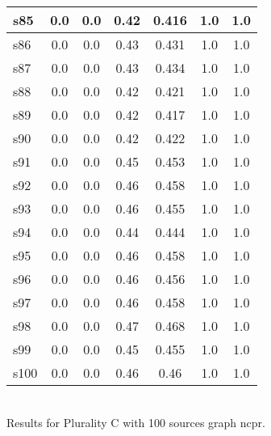 \documentclass{article}
\begin{document}
\begin{tabular}{|l|c|c|c|c|c|c|}
\hline
s85 &0.0 & 0.0 & 0.42 & 0.416 & 1.0 & 1.0\\
\hline
s86 &0.0 & 0.0 & 0.43 & 0.431 & 1.0 & 1.0\\
\hline
s87 &0.0 & 0.0 & 0.43 & 0.434 & 1.0 & 1.0\\
\hline
s88 &0.0 & 0.0 & 0.42 & 0.421 & 1.0 & 1.0\\
\hline
s89 &0.0 & 0.0 & 0.42 & 0.417 & 1.0 & 1.0\\
\hline
s90 &0.0 & 0.0 & 0.42 & 0.422 & 1.0 & 1.0\\
\hline
s91 &0.0 & 0.0 & 0.45 & 0.453 & 1.0 & 1.0\\
\hline
s92 &0.0 & 0.0 & 0.46 & 0.458 & 1.0 & 1.0\\
\hline
s93 &0.0 & 0.0 & 0.46 & 0.455 & 1.0 & 1.0\\
\hline
s94 &0.0 & 0.0 & 0.44 & 0.444 & 1.0 & 1.0\\
\hline
s95 &0.0 & 0.0 & 0.46 & 0.458 & 1.0 & 1.0\\
\hline
s96 &0.0 & 0.0 & 0.46 & 0.456 & 1.0 & 1.0\\
\hline
s97 &0.0 & 0.0 & 0.46 & 0.458 & 1.0 & 1.0\\
\hline
s98 &0.0 & 0.0 & 0.47 & 0.468 & 1.0 & 1.0\\
\hline
s99 &0.0 & 0.0 & 0.45 & 0.455 & 1.0 & 1.0\\
\hline
s100 &0.0 & 0.0 & 0.46 & 0.46 & 1.0 & 1.0\\
\hline
\end{tabular}\\

\noindent Results for Plurality C with 100 sources graph ncpr.
\end{document}

